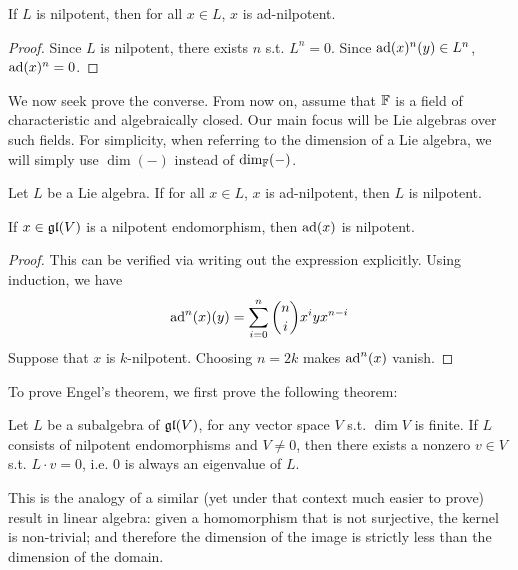 \documentclass{article}
\begin{document}
\begin{lemma}
    If $L$ is nilpotent, then for all $x \in L$, $x$ is ad-nilpotent.
\end{lemma}

\begin{proof}
    Since $L$ is nilpotent, there exists $n$ s.t. $L^n = 0$. Since $\operatorname{ad}(x)^n (y) \in L^n$, $\operatorname{ad}(x)^n = 0$.
\end{proof}

\textstart
We now seek prove the converse. From now on, assume that $\mathbb{F}$ is a field of characteristic and algebraically closed. Our main focus will be Lie algebras over such fields. For simplicity, when referring to the dimension of a Lie algebra, we will simply use $\dim (-)$ instead of $\dim_{\mathbb{F}} (-)$.

\begin{theorem}[Engel]\label{thm: Engel}
    Let $L$ be a Lie algebra. If for all $x \in L$, $x$ is ad-nilpotent, then $L$ is nilpotent.
\end{theorem}

\begin{lemma}
    If $x \in \mathfrak{gl}(V)$ is a nilpotent endomorphism, then $\operatorname{ad}(x)$ is nilpotent.
\end{lemma}

\begin{proof}
    This can be verified via writing out the expression explicitly. Using induction, we have
    \[
        \operatorname{ad}^n(x) (y) = \sum_{i = 0}^n \binom{n}{i} x^i y x^{n-i}
    \]
    Suppose that $x$ is $k$-nilpotent. Choosing $n = 2k$ makes $\operatorname{ad}^n(x)$ vanish.
\end{proof}

To prove Engel's theorem, we first prove the following theorem:

\begin{theorem}\label{thm: 0 is eigenvalue of lie algebra of nilpotent endomorphisms}
    Let $L$ be a subalgebra of $\mathfrak{gl}(V)$, for any vector space $V$ s.t. $\dim V$ is finite. If $L$ consists of nilpotent endomorphisms and $V \neq 0$, then there exists a nonzero $v \in V$ s.t. $L \cdot v = 0$, i.e. 0 is always an eigenvalue of $L$.
\end{theorem}
\nogap
\begin{remark}
    This is the analogy of a similar (yet under that context much easier to prove) result in linear algebra: given a homomorphism that is not surjective, the kernel is non-trivial; and therefore the dimension of the image is strictly less than the dimension of the domain.
\end{remark}
\end{document}

